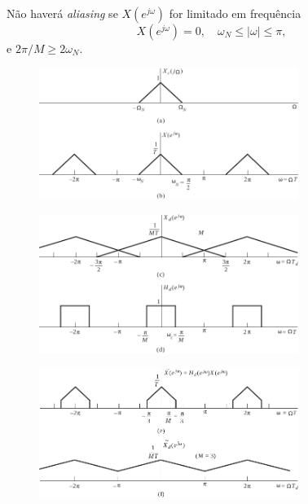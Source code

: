 \begin{frame}[allowframebreaks]
  Não haverá \textit{aliasing} se $X(e^{j\omega})$ for limitado em frequência
  \begin{equation}
  X(e^{j\omega}) = 0 , \quad \omega_N \leq \vert \omega \vert \leq \pi,
  \end{equation}
  e $2\pi/M \geq 2 \omega_N$.

        \begin{figure}[h!]
        \centering
        \includegraphics[width=0.75\textwidth]{images/fig421ab.pdf}
        \label{fig:fig421ab}
        \end{figure}

        \begin{figure}[h!]
        \centering
        \includegraphics[width=0.75\textwidth]{images/fig421cd.pdf}
        \label{fig:fig421cd}
        \end{figure}

        \begin{figure}[h!]
        \centering
        \includegraphics[width=0.75\textwidth]{images/fig421ef.pdf}
        \label{fig:fig421ef}
        \end{figure}



\end{frame}
